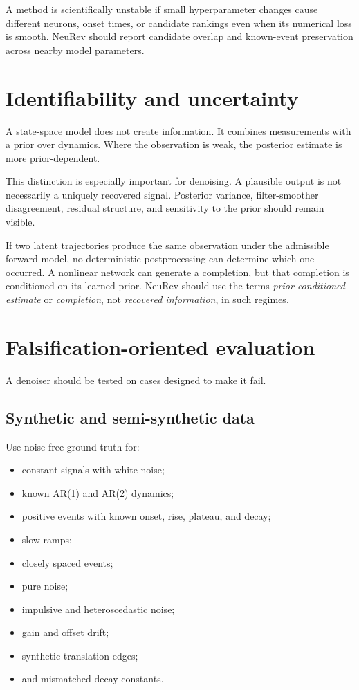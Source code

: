 \documentclass[11pt]{article}
\begin{document}
A method is scientifically unstable if small hyperparameter changes cause
different neurons, onset times, or candidate rankings even when its numerical
loss is smooth. NeuRev should report candidate overlap and known-event
preservation across nearby model parameters.

\section{Identifiability and uncertainty}

A state-space model does not create information. It combines measurements with
a prior over dynamics. Where the observation is weak, the posterior estimate is
more prior-dependent.

This distinction is especially important for denoising. A plausible output is
not necessarily a uniquely recovered signal. Posterior variance, filter-smoother
disagreement, residual structure, and sensitivity to the prior should remain
visible.

If two latent trajectories produce the same observation under the admissible
forward model, no deterministic postprocessing can determine which one
occurred. A nonlinear network can generate a completion, but that completion is
conditioned on its learned prior. NeuRev should use the terms
\emph{prior-conditioned estimate} or \emph{completion}, not
\emph{recovered information}, in such regimes.

\section{Falsification-oriented evaluation}

A denoiser should be tested on cases designed to make it fail.

\subsection{Synthetic and semi-synthetic data}

Use noise-free ground truth for:
\begin{itemize}[leftmargin=*]
\item constant signals with white noise;
\item known AR(1) and AR(2) dynamics;
\item positive events with known onset, rise, plateau, and decay;
\item slow ramps;
\item closely spaced events;
\item pure noise;
\item impulsive and heteroscedastic noise;
\item gain and offset drift;
\item synthetic translation edges;
\item and mismatched decay constants.
\end{itemize}
\end{document}
